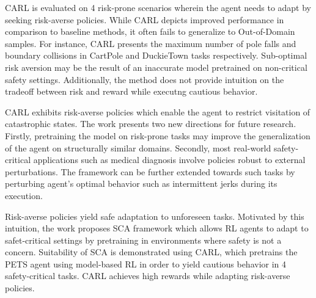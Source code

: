 \documentclass[11pt,letterpaper]{article}
\begin{document}
CARL is evaluated on 4 risk-prone scenarios wherein the agent needs to adapt by seeking risk-averse policies. While CARL depicts improved performance in comparison to baseline methods, it often fails to generalize to Out-of-Domain samples. For instance, CARL presents the maximum number of pole falls and boundary collisions in CartPole and DuckieTown tasks respectively. Sub-optimal risk aversion may be the result of an inaccurate model pretrained on non-critical safety settings. Additionally, the method does not provide intuition on the tradeoff between risk and reward while executng cautious behavior. 

CARL exhibits risk-averse policies which enable the agent to restrict visitation of catastrophic states. The work presents two new directions for future research. Firstly, pretraining the model on risk-prone tasks may improve the generalization of the agent on structurally similar domains. Secondly, most real-world safety-critical applications such as medical diagnosis involve policies robust to external perturbations. The framework can be further extended towards such tasks by perturbing agent's optimal behavior such as intermittent jerks during its execution. 

Risk-averse policies yield safe adaptation to unforeseen tasks. Motivated by this intuition, the work proposes SCA framework which allows RL agents to adapt to safet-critical settings by pretraining in environments where safety is not a concern. Suitability of SCA is demonstrated using CARL, which pretrains the PETS agent using model-based RL in order to yield cautious behavior in 4 safety-critical tasks. CARL achieves high rewards while adapting risk-averse policies. 
\end{document}
